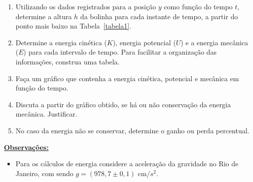 \begin{enumerate}
\item Utilizando os dados registrados para a posição $y$ como função do tempo $t$, determine a altura $h$ da bolinha para cada instante de tempo, a partir do ponto mais baixo na Tabela~\ref{tabela1}.
\item Determine a energia cinética ($K$), energia potencial ($U$) e a energia mecânica ($E$) para cada intervalo de tempo. Para facilitar a organização das informações, construa uma tabela.
\item Faça um gráfico que contenha a energia cinética, potencial e mecânica em função do tempo.
\item Discuta a partir do gráfico obtido, se há ou não conservação da energia mecânica. Justificar.
\item No caso da energia não se conservar, determine o ganho ou perda percentual.
\end{enumerate}
\underline{\bf Observações:}
\begin{itemize}
\item Para os cálculos de energia considere a aceleração da gravidade no Rio de Janeiro, com 
sendo $g=(978,7 \pm 0,1)$ cm/$s^2$.
\end{itemize}
\clearpage

\thispagestyle{plain}